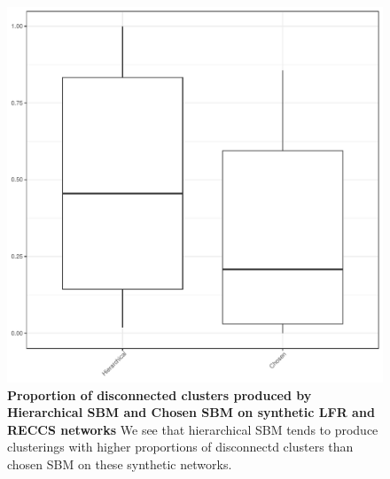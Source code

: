 \documentclass[aps,pre,superscriptaddress]{revtex4}
\begin{document}
\begin{figure}[!htpb]
	\centering
	\includegraphics[]{figures/conn_box.pdf}
	\caption[]{\textbf{Proportion of disconnected clusters produced by Hierarchical SBM and Chosen SBM on synthetic LFR and RECCS networks}  We see that hierarchical SBM tends to produce clusterings with higher proportions of disconnectd clusters than chosen SBM on these synthetic networks.}
	\label{fig:synthetic-connectivity}
\end{figure}
\end{document}
